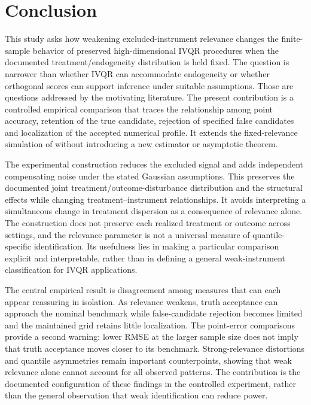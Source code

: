 \section{Conclusion}
This study asks how weakening excluded-instrument relevance changes the finite-sample behavior of preserved high-dimensional IVQR procedures when the documented treatment/endogeneity distribution is held fixed. The question is narrower than whether IVQR can accommodate endogeneity or whether orthogonal scores can support inference under suitable assumptions. Those are questions addressed by the motivating literature. The present contribution is a controlled empirical comparison that traces the relationship among point accuracy, retention of the true candidate, rejection of specified false candidates and localization of the accepted numerical profile. It extends the fixed-relevance simulation of \textcite{chen_huang_tien_2021} without introducing a new estimator or asymptotic theorem.

The experimental construction reduces the excluded signal and adds independent compensating noise under the stated Gaussian assumptions. This preserves the documented joint treatment/outcome-disturbance distribution and the structural effects while changing treatment--instrument relationships. It avoids interpreting a simultaneous change in treatment dispersion as a consequence of relevance alone. The construction does not preserve each realized treatment or outcome across settings, and the relevance parameter is not a universal measure of quantile-specific identification. Its usefulness lies in making a particular comparison explicit and interpretable, rather than in defining a general weak-instrument classification for IVQR applications.

The central empirical result is disagreement among measures that can each appear reassuring in isolation. As relevance weakens, truth acceptance can approach the nominal benchmark while false-candidate rejection becomes limited and the maintained grid retains little localization. The point-error comparisons provide a second warning: lower RMSE at the larger sample size does not imply that truth acceptance moves closer to its benchmark. Strong-relevance distortions and quantile asymmetries remain important counterpoints, showing that weak relevance alone cannot account for all observed patterns. The contribution is the documented configuration of these findings in the controlled experiment, rather than the general observation that weak identification can reduce power.

